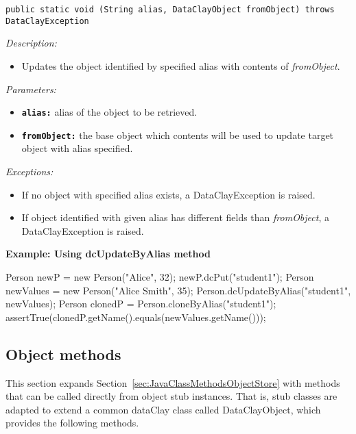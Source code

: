 
\begin{dBox}
\texttt{public static void  (String alias, \newline DataClayObject fromObject) throws DataClayException}
\LINE

{\it Description:}

\begin{itemize}
    \item Updates the object identified by specified alias with contents of \textit{fromObject}.
\end{itemize}

{\it Parameters:}
\begin{itemize}
    \item \texttt{\bfseries alias:} alias of the object to be retrieved.
    \item \texttt{\bfseries fromObject:} the base object which contents will be used to update target object with alias specified.
\end{itemize}

{\it Exceptions:}

\begin{itemize}
    \item If no object with specified alias exists, a DataClayException is raised.
    \item If object identified with given alias has different fields than \textit{fromObject}, a DataClayException is raised.
\end{itemize}

\end{dBox}

\begin{tBox}
\textcolor{basecolor} {\bf Example: Using dcUpdateByAlias method}
\begin{java}
Person newP = new Person("Alice", 32);
newP.dcPut("student1");
Person newValues = new Person("Alice Smith", 35);
Person.dcUpdateByAlias("student1", newValues);
Person clonedP = Person.cloneByAlias("student1");
assertTrue(clonedP.getName().equals(newValues.getName()));
\end{java}
\end{tBox}


\subsection{Object methods}
\label{sec:JavaObjectStoreStubMethods}

This section expands Section~\ref{sec:JavaClassMethodsObjectStore} with methods that can be called directly from object stub instances. That is, stub classes are adapted to extend a common dataClay class called DataClayObject, which provides the following methods.


